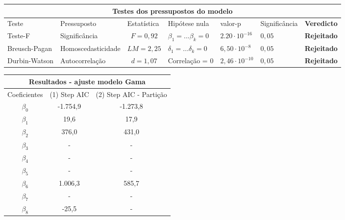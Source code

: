 \documentclass{article}
\begin{document}
\begin{table}[]
	\centering
	\begin{tabular}{lccllll}
		\hline
		\multicolumn{7}{c}{\textbf{Testes dos pressupostos do modelo}}  
		                                \\ \hline
		\multicolumn{1}{l|}{Teste}  & \multicolumn{1}{l}{Pressuposto} & \multicolumn{1}{l}{Estatística} & \multicolumn{1}{l}{Hipótese nula} & \multicolumn{1}{l}{valor-p} &\multicolumn{1}{l}{Significância} & \multicolumn{1}{l}{\textbf{Veredicto}} \\ \hline
		
		\multicolumn{1}{l|}{Teste-F} & \multicolumn{1}{l}{Significância}  & $F = 0,92$    & $\beta_1 = ... \beta_k = 0$ &   $2.20 \cdot 10^{-16}$    & $0,05$ & {\color[HTML]{036400} \textbf{Rejeitado}} \\
		\multicolumn{1}{l|}{Breusch-Pagan} & \multicolumn{1}{l}{Homoscedasticidade}    & $LM = 2,25$   & $\delta_1 = ... \delta_k = 0$ &    $6,50 \cdot 10^{-8}$    & $0,05$ &   {\color[HTML]{FE0000} \textbf{Rejeitado}}                 \\
		
		\multicolumn{1}{l|}{Durbin-Watson} & \multicolumn{1}{l}{Autocorrelação} & $d= 1,07$    & Correlação = $0$ &   $2,46 \cdot 10^{-10}$   & $0,05$ &   {\color[HTML]{FE0000} \textbf{Rejeitado}}                 \\ \hline
	\end{tabular}
\end{table}


\begin{table}[]
	\centering
	\begin{tabular}{ccc}
		\hline
		\multicolumn{3}{c}{\textbf{Resultados - ajuste modelo Gama}}               \\ \hline
		\multicolumn{1}{l}{Coeficientes} & (1) Step AIC & (2) Step AIC - Partição \\ \hline
		$\beta_0$                        & -1.754,9    & -1.273,8 \\
		$\beta_1$                        & 19,6        & 17,9     \\
		$\beta_2$                        & 376,0       & 431,0    \\
		$\beta_3$                        & -           & -        \\
		$\beta_4$                        & -           & -        \\
		$\beta_5$                        & -           & -        \\
		$\beta_6$                        & 1.006,3     & 585,7    \\
		$\beta_7$                        & -           & -        \\
		$\beta_8$                        & -25,5       & -        \\ \hline
	\end{tabular}
	\label{tab:my-table}
\end{table}
\end{document}
